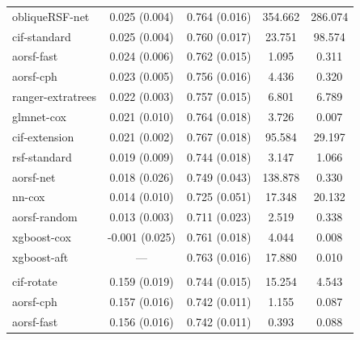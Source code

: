\documentclass[twoside,11pt]{article}\usepackage[]{graphicx}\usepackage[]{xcolor}
\newenvironment{knitrout}{}{} %
\begin{document}
\begin{knitrout}
\begin{longtable}[t]{lcccc}
\hspace{1em}obliqueRSF-net & 0.025 (0.004) & 0.764 (0.016) & 354.662 & 286.074\\
\hspace{1em}cif-standard & 0.025 (0.004) & 0.760 (0.017) & 23.751 & 98.574\\
\hspace{1em}aorsf-fast & 0.024 (0.006) & 0.762 (0.015) & 1.095 & 0.311\\
\hspace{1em}aorsf-cph & 0.023 (0.005) & 0.756 (0.016) & 4.436 & 0.320\\
\hspace{1em}ranger-extratrees & 0.022 (0.003) & 0.757 (0.015) & 6.801 & 6.789\\
\hspace{1em}glmnet-cox & 0.021 (0.010) & 0.764 (0.018) & 3.726 & 0.007\\
\hspace{1em}cif-extension & 0.021 (0.002) & 0.767 (0.018) & 95.584 & 29.197\\
\hspace{1em}rsf-standard & 0.019 (0.009) & 0.744 (0.018) & 3.147 & 1.066\\
\hspace{1em}aorsf-net & 0.018 (0.026) & 0.749 (0.043) & 138.878 & 0.330\\
\hspace{1em}nn-cox & 0.014 (0.010) & 0.725 (0.051) & 17.348 & 20.132\\
\hspace{1em}aorsf-random & 0.013 (0.003) & 0.711 (0.023) & 2.519 & 0.338\\
\hspace{1em}xgboost-cox & -0.001 (0.025) & 0.761 (0.018) & 4.044 & 0.008\\
\hspace{1em}xgboost-aft & --- & 0.763 (0.016) & 17.880 & 0.010\\
\addlinespace[0.3em]
\multicolumn{5}{l}{\textit{\textbf{Monoclonal gammopathy; death, n = 1384, p = 8}}}\\
\hline
\hspace{1em}cif-rotate & 0.159 (0.019) & 0.744 (0.015) & 15.254 & 4.543\\
\hspace{1em}aorsf-cph & 0.157 (0.016) & 0.742 (0.011) & 1.155 & 0.087\\
\hspace{1em}aorsf-fast & 0.156 (0.016) & 0.742 (0.011) & 0.393 & 0.088\\

\end{longtable}
\end{knitrout}
\end{document}
